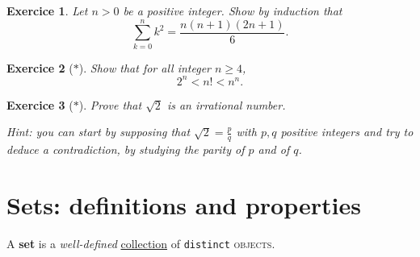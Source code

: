 \documentclass[
	fontsize=10pt, %
	twoside=true, %
	secnumdepth=1, %
	numbers=noenddot, %
]{kaobook}
\newtheorem{exer}{Exercice}[chapter]
\begin{document}
\begin{exer}
Let $n>0$ be a positive integer. Show by induction that
\begin{equation*}\sum\limits_{k=0}^{n}k^2=\frac{n(n+1)(2n+1)}{6}.\end{equation*}
\end{exer}

\begin{exer}[$\ast$]
Show that for all integer $n\geq 4$,
\begin{equation*}
2^{n}<n!<n^{n}.
\end{equation*}
\end{exer}

\begin{exer}[$\ast$]
Prove that $\sqrt{2}$ is an irrational number.

Hint: you can start by supposing that $\sqrt{2}=\frac{p}{q}$ with $p,q$ positive integers and try to deduce a contradiction, by studying the parity of $p$ and of $q$.
\end{exer}










































\chapter{Sets: definitions and properties}
A \textbf{set} is a \emph{well-defined} \underline{collection} of \texttt{distinct} \textsc{objects}.
\end{document}

